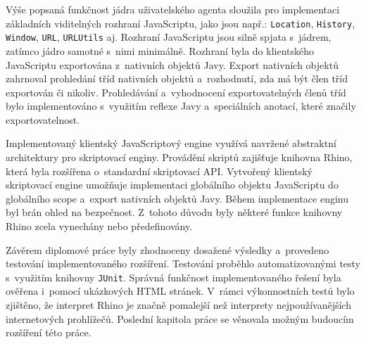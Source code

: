 Výše popsaná funkčnost jádra uživatelského agenta sloužila pro implementaci základních viditelných rozhraní JavaScriptu, jako jsou např.: \texttt{Location}, \texttt{History}, \texttt{Window}, \texttt{URL}, \texttt{URLUtils} aj. Rozhraní JavaScriptu jsou silně spjata s~jádrem, zatímco jádro samotné s~nimi minimálně. Rozhraní byla do klientského JavaScriptu exportována z~nativních objektů Javy. Export nativních objektů zahrnoval prohledání tříd nativních objektů a~rozhodnutí, zda má být člen tříd exportován či nikoliv. Prohledávání a~vyhodnocení exportovatelných členů tříd bylo implementováno s~využitím reflexe Javy a~speciálních anotací, které značily exportovatelnost.

Implementovaný klientský JavaScriptový engine využívá navržené abstraktní architektury pro skriptovací enginy. Provádění skriptů zajišťuje knihovna Rhino, která byla rozšířena o~standardní skriptovací API. Vytvořený klientský skriptovací engine umožňuje implementaci globálního objektu JavaScriptu do globálního scope  a~export nativních objektů Javy. Během implementace enginu byl brán ohled na bezpečnost. Z~tohoto důvodu byly některé funkce knihovny Rhino zcela vynechány nebo předefinovány.

Závěrem diplomové práce byly zhodnoceny dosažené výsledky a~provedeno testování implementovaného rozšíření. Testování proběhlo automatizovanými testy s~využitím knihovny \texttt{JUnit}. Správná funkčnost implementovaného řešení byla ověřena i~pomocí ukázkových HTML stránek. V~rámci výkonnostních testů bylo zjištěno, že interpret Rhino je značně pomalejší než interprety nejpoužívanějších internetových prohlížečů. Poslední kapitola práce se věnovala možným budoucím rozšíření této práce.

